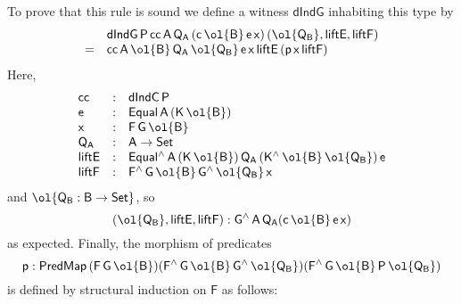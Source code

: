 \documentclass[sigplan,10pt]{acmart}
\begin{document}
To prove that this rule is sound we define a witness
$\mathsf{dIndG}$ inhabiting this type by
\[\begin{array}{ll}
 & \mathsf{dIndG\,P\,cc\,A\,Q_A\,(c\,\ol{B}\,e\,x)\,(\ol{Q_B}, liftE, liftF)}\\
= & \mathsf{cc\,A\,\ol{B}\,Q_A\,\ol{Q_B}\,e\,x\,liftE\,(p\,x\,liftF)}
\end{array}\]
Here,
\[\begin{array}{lll}
\mathsf{cc} & : & \mathsf{dIndC\,P}\\
\mathsf{e} & : & \mathsf{Equal\,A\,(K\,\ol{B})}\\
\mathsf{x} & : & \mathsf{F\,G\,\ol{B}}\\
\mathsf{Q_A} & : & \mathsf{A \to Set}\\
\mathsf{liftE} & : & \mathsf{Equal^{\wedge}\,A\,(K\,\ol{B})\,Q_A\,
  (K^{\wedge}\,\ol{B}\,\ol{Q_B})\,e}\\
\mathsf{liftF} & : &
\mathsf{F^{\wedge}\,G\,\ol{B}\,G^{\wedge}\,{\ol{Q_B}}\,x}
\end{array}\]
and $\ol{\mathsf{Q_B : B \to Set}}$,
so
\[\mathsf{(\ol{Q_B}, liftE, liftF) : G^{\wedge}\,A\,Q_A (c\,\ol{B}\,
  e\,x)}\] as expected.  Finally, the morphism of predicates
\[\mathsf{p : PredMap\,(F\,G\,\ol{B})
  (F^{\wedge}\,G\,\ol{B}\,G^{\wedge}\,\ol{Q_B}) 
  (F^{\wedge}\,G\,\ol{B}\,P\,\ol{Q_B})}\] is defined by structural
induction on $\mathsf{F}$ as follows:
\end{document}
